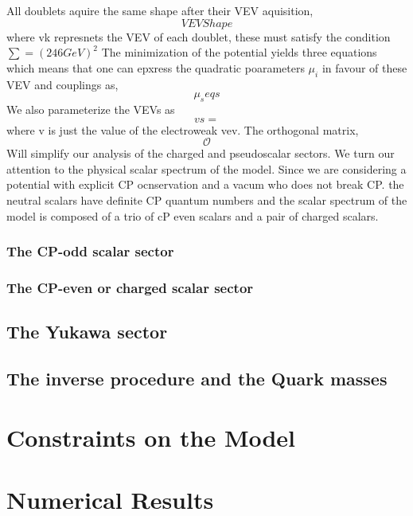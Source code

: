 All doublets aquire the same shape after their  VEV aquisition, 
\begin{equation}
VEV Shape 
\end{equation}
where vk represnets the VEV of each doublet, these must satisfy the condition $\sum = (246 GeV)^2$ The minimization of the potential yields three equations which means that one can epxress the quadratic poarameters  $\mu_i$ in favour of these VEV and couplings as, 
\begin{equation}
\mu_s eqs 
\end{equation}
We also parameterize the VEVs as
\begin{equation}
vs = 
\end{equation}
where v is just the value of the electroweak vev. The orthogonal matrix, 
\begin{equation}
\mathcal{O}
\end{equation}
Will simplify our analysis of the charged and pseudoscalar sectors. We turn our attention to the physical scalar spectrum of the model. Since we are considering a potential with explicit CP ocnservation and a vacum who does not break CP. the neutral scalars have definite CP quantum numbers and the scalar spectrum of the model is composed of a trio of cP even scalars and a pair of charged scalars. 

\subsubsection{The CP-odd scalar sector}

\subsubsection{The CP-even or charged scalar sector}

\subsection{The Yukawa sector}

\subsection{The inverse procedure and the Quark masses}

\section{Constraints on the Model}

\section{Numerical Results}

